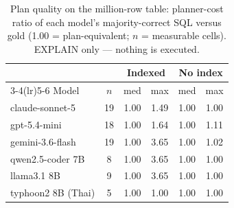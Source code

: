 \begin{table}[t]
\caption{Plan quality on the million-row table: planner-cost ratio of
each model's majority-correct SQL versus gold (1.00 = plan-equivalent;
$n$ = measurable cells). EXPLAIN only --- nothing is executed.}
\label{tab:plan}
\centering\small
\begin{tabular}{lccccc}
\toprule
 & & \multicolumn{2}{c}{Indexed} & \multicolumn{2}{c}{No index} \\
\cmidrule(lr){3-4}\cmidrule(lr){5-6}
Model & $n$ & med & max & med & max \\
\midrule
claude-sonnet-5 & 19 & 1.00 & 1.49 & 1.00 & 1.00 \\
gpt-5.4-mini & 18 & 1.00 & 1.64 & 1.00 & 1.11 \\
gemini-3.6-flash & 19 & 1.00 & 3.65 & 1.00 & 1.02 \\
qwen2.5-coder 7B & 8 & 1.00 & 3.65 & 1.00 & 1.00 \\
llama3.1 8B & 9 & 1.00 & 3.65 & 1.00 & 1.00 \\
typhoon2 8B (Thai) & 5 & 1.00 & 1.00 & 1.00 & 1.00 \\
\bottomrule
\end{tabular}
\end{table}
